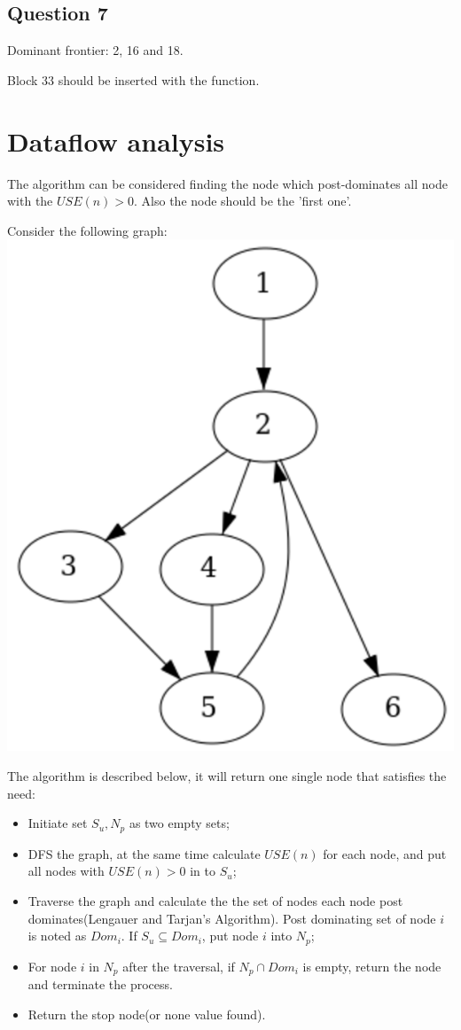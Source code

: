 \documentclass[12pt]{article}
\begin{document}
\subsection{Question 7}
Dominant frontier: 2, 16 and 18.

Block 33 should be inserted with the function.

\section{ Dataflow analysis}

The algorithm can be considered finding the node which  post-dominates
all node with the $USE(n)>0$. Also the node should be the 'first
one'.

Consider the following graph:
\includegraphics[scale=0.5]{pic1.png}

The algorithm is described below, it will return one single node that
satisfies the need:
\begin{itemize}
\item Initiate set $S_{u}, N_{p}$ as two empty sets;
\item DFS the graph, at the same time calculate $USE(n)$ for each
  node, and put all nodes with $USE(n)>0$ in to $S_{u}$;
\item Traverse the graph and calculate the the set of nodes each node post dominates(Lengauer
  and Tarjan’s Algorithm). Post dominating set of node $i$ is noted as
  $Dom_{i}$. If $S_{u} \subseteq Dom_{i}$, put node $i$ into $N_{p}$;
\item For node $i$ in $N_{p}$ after the traversal, if $N_{p} \cap
  Dom_{i}$ is empty, return the node and terminate the process.
\item Return the stop node(or none value found).
\end{itemize}
\end{document}
